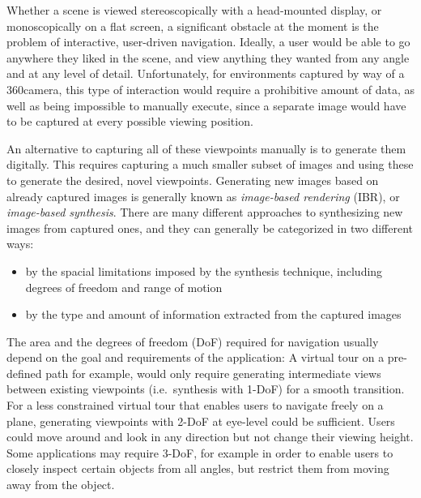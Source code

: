 Whether a scene is viewed stereoscopically with a head-mounted display, or monoscopically on a flat screen, a significant obstacle at the moment is the problem of interactive, user-driven navigation. Ideally, a user would be able to go anywhere they liked in the scene, and view anything they wanted from any angle and at any level of detail. Unfortunately, for environments captured by way of a 360\degree camera, this type of interaction would require a prohibitive amount of data, as well as being impossible to manually execute, since a separate image would have to be captured at every possible viewing position.
\newpage

An alternative to capturing all of these viewpoints manually is to generate them digitally. This requires capturing a much smaller subset of images and using these to generate the desired, novel viewpoints. Generating new images based on already captured images is generally known as \emph{image-based rendering} (IBR), or \emph{image-based synthesis}. There are many different approaches to synthesizing new images from captured ones, and they can generally be categorized in two different ways:
\begin{itemize}
  \item by the spacial limitations imposed by the synthesis technique, including degrees of freedom and range of motion
  \item by the type and amount of information extracted from the captured images
\end{itemize}

\noindent
The area and the degrees of freedom (DoF) required for navigation usually depend on the goal and requirements of the application: A virtual tour on a pre-defined path for example, would only require generating intermediate views between existing viewpoints (i.e.\ synthesis with 1-DoF) for a smooth transition. For a less constrained virtual tour that enables users to navigate freely on a plane, generating viewpoints with 2-DoF at eye-level could be sufficient. Users could move around and look in any direction but not change their viewing height. Some applications may require 3-DoF, for example in order to enable users to closely inspect certain objects from all angles, but restrict them from moving away from the object.

